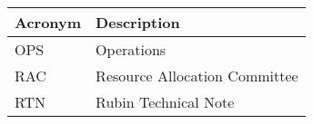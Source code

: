 \addtocounter{table}{-1}
\begin{longtable}{p{}p{}}\hline
\textbf{Acronym} & \textbf{Description}  \\\hline

OPS & Operations \\\hline
RAC & Resource Allocation Committee \\\hline
RTN & Rubin Technical Note \\\hline
\end{longtable}

